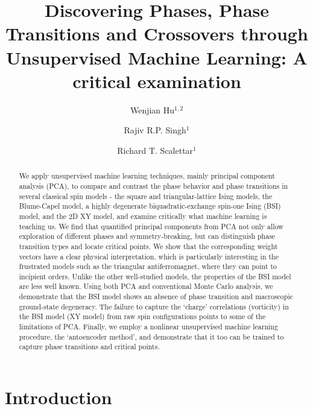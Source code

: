 \documentclass[pra,letterpaper,10pt,twocolumn]{revtex4}
\begin{document}
\title{Discovering Phases, Phase Transitions and Crossovers
through Unsupervised Machine Learning: A critical
examination}

\author{Wenjian Hu$^{1,2}$}
\author{Rajiv R.P. Singh$^{1}$}
\author{Richard T. Scalettar$^{1}$}

\begin{abstract} 
We apply unsupervised machine learning techniques, mainly principal component analysis (PCA), to compare and
contrast the phase behavior and phase transitions in several classical
spin models - the square and triangular-lattice Ising models, the
Blume-Capel model, a highly degenerate biquadratic-exchange spin-one
Ising (BSI) model, and the 2D XY model, and examine critically what
machine learning is teaching us.  We find that quantified principal
components from PCA not only allow
exploration of different phases and symmetry-breaking, but can
distinguish phase transition types and locate critical points. We show
that the corresponding weight vectors have a clear physical
interpretation, which is particularly interesting in the frustrated
models such as the triangular antiferromagnet, where they can point to
incipient orders.  Unlike the other well-studied models, the properties
of the BSI model are less well known.  Using both PCA and conventional
Monte Carlo analysis, we demonstrate that the BSI model shows an absence
of phase transition and macroscopic ground-state degeneracy.  The
failure to capture the `charge' correlations (vorticity) in the BSI
model (XY model) from raw spin configurations points to some of the
limitations of PCA.  Finally, we employ a nonlinear unsupervised machine
learning procedure, the `antoencoder method', and demonstrate that it
too can be trained to capture phase transitions and critical points.
\end{abstract}


\maketitle 


\section{Introduction}
\end{document}
